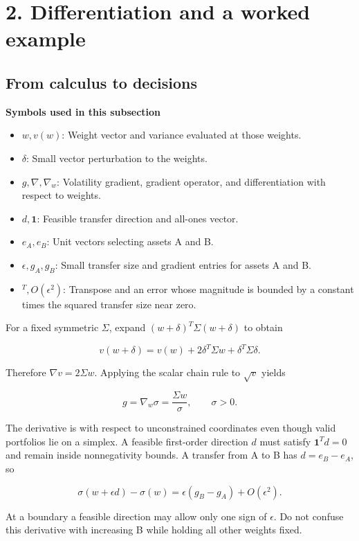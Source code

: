 \documentclass[
  american,
  11pt,
]{article}
\begin{document}
\section{2. Differentiation and a worked
example}\label{differentiation-and-a-worked-example}

\subsection{From calculus to
decisions}\label{from-calculus-to-decisions}

\textbf{Symbols used in this subsection}
\begin{itemize}
\item \(w,v(w)\): Weight vector and variance evaluated at those weights.
\item \(\delta\): Small vector perturbation to the weights.
\item \(g,\nabla,\nabla_w\): Volatility gradient, gradient operator, and differentiation with respect to weights.
\item \(d,\mathbf1\): Feasible transfer direction and all-ones vector.
\item \(e_A,e_B\): Unit vectors selecting assets A and B.
\item \(\epsilon,g_A,g_B\): Small transfer size and gradient entries for assets A and B.
\item \({}^T,O(\epsilon^2)\): Transpose and an error whose magnitude is bounded by a constant times the squared transfer size near zero.
\end{itemize}


For a fixed symmetric \(\Sigma\), expand
\((w+\delta)^T\Sigma(w+\delta)\) to obtain

\[v(w+\delta)=v(w)+2\delta^T\Sigma w+\delta^T\Sigma\delta.\]

Therefore \(\nabla v=2\Sigma w\). Applying the scalar chain rule to
\(\sqrt v\) yields

\[g=\nabla_w\sigma=\frac{\Sigma w}{\sigma},\qquad \sigma>0.\]

The derivative is with respect to unconstrained coordinates even though
valid portfolios lie on a simplex. A feasible first-order direction
\(d\) must satisfy \(\mathbf1^Td=0\) and remain inside nonnegativity
bounds. A transfer from A to B has \(d=e_B-e_A\), so

\[\sigma(w+\epsilon d)-\sigma(w)=\epsilon(g_B-g_A)+O(\epsilon^2).\]

At a boundary a feasible direction may allow only one sign of
\(\epsilon\). Do not confuse this derivative with increasing B while
holding all other weights fixed.
\end{document}
